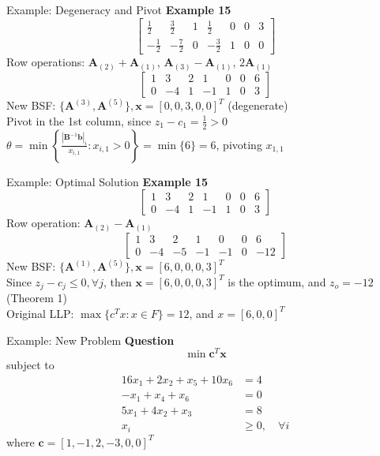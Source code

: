 \documentclass[aspectratio=169,hyperref,UTF8,CJK]{beamer}
\begin{document}
\begin{frame}{Example: Degeneracy and Pivot}
\textbf{Example 15}
\[
\begin{bmatrix}
\frac{1}{2} & \frac{3}{2} & 1 & \frac{1}{2} & 0 & 0 & 3 \\
-\frac{1}{2} & -\frac{7}{2} & 0 & -\frac{3}{2} & 1 & 0 & 0
\end{bmatrix}
\]
Row operations: \(\mathbf{A}_{(2)} + \mathbf{A}_{(1)}\), \(\mathbf{A}_{(3)} - \mathbf{A}_{(1)}\), \(2\mathbf{A}_{(1)}\)
\[
\begin{bmatrix}
1 & 3 & 2 & 1 & 0 & 0 & 6 \\
0 & -4 & 1 & -1 & 1 & 0 & 3
\end{bmatrix}
\]
New BSF: \(\{\mathbf{A}^{(3)},\mathbf{A}^{(5)}\}, \mathbf{x} = [0,0,3,0,0]^T\) (degenerate) \\
Pivot in the 1st column, since \(z_1 - c_1 = \frac{1}{2} > 0\) \\
\(\theta = \min \left\{ \frac{|\mathbf{B}^{-1}\mathbf{b}|_i}{x_{i,1}} : x_{i,1} > 0 \right\} = \min \{6\} = 6\), pivoting \(x_{1,1}\)
\end{frame}

\begin{frame}{Example: Optimal Solution}
\textbf{Example 15}
\[
\begin{bmatrix}
1 & 3 & 2 & 1 & 0 & 0 & 6 \\
0 & -4 & 1 & -1 & 1 & 0 & 3
\end{bmatrix}
\]
Row operation: \(\mathbf{A}_{(2)} - \mathbf{A}_{(1)}\)
\[
\begin{bmatrix}
1 & 3 & 2 & 1 & 0 & 0 & 6 \\
0 & -4 & -5 & -1 & -1 & 0 & -12
\end{bmatrix}
\]
New BSF: \(\{\mathbf{A}^{(1)},\mathbf{A}^{(5)}\}, \mathbf{x} = [6,0,0,0,3]^T\) \\
Since \(z_j - c_j \leq 0, \forall j\), then \(\mathbf{x} = [6,0,0,0,3]^T\) is the optimum, and \(z_o = -12\) (Theorem 1) \\
Original LLP: \(\max \{c^T x : x \in F\} = 12\), and \(x = [6, 0, 0]^T\)
\end{frame}

\begin{frame}{Example: New Problem}
\textbf{Question} \\
\[
\min \mathbf{c}^T\mathbf{x}
\]
subject to
\begin{align*}
16x_{1} + 2x_{2} + x_{5} + 10x_{6} &= 4 \\
-x_{1} + x_{4} + x_{6} &= 0 \\
5x_{1} + 4x_{2} + x_{3} &= 8 \\
x_{i} &\geq 0, \quad \forall i
\end{align*}
where \(\mathbf{c} = [1, -1, 2, -3, 0, 0]^T\)
\end{frame}
\end{document}
